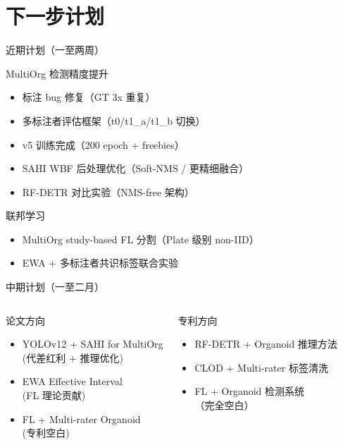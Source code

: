 \documentclass[aspectratio=169, 11pt]{beamer}
\begin{document}
\section{下一步计划}

\begin{frame}{近期计划（一至两周）}
  \begin{block}{MultiOrg 检测精度提升}
    \begin{itemize}
      \item[\checkmark] 标注 bug 修复（GT 3x 重复）
      \item[\checkmark] 多标注者评估框架（t0/t1\_a/t1\_b 切换）
      \item[$\circ$] v5 训练完成（200 epoch + freebies）
      \item[$\circ$] SAHI WBF 后处理优化（Soft-NMS / 更精细融合）
      \item[$\circ$] RF-DETR 对比实验（NMS-free 架构）
    \end{itemize}
  \end{block}
  \begin{block}{联邦学习}
    \begin{itemize}
      \item[$\circ$] MultiOrg study-based FL 分割（Plate 级别 non-IID）
      \item[$\circ$] EWA + 多标注者共识标签联合实验
    \end{itemize}
  \end{block}
\end{frame}

\begin{frame}{中期计划（一至二月）}
  \begin{columns}[T]
    \begin{block}{论文方向}
      \begin{itemize}
        \item YOLOv12 + SAHI for MultiOrg\\
              (代差红利 + 推理优化)
        \item EWA Effective Interval\\
              (FL 理论贡献)
        \item FL + Multi-rater Organoid\\
              (专利空白)
      \end{itemize}
    \end{block}
    \begin{block}{专利方向}
      \begin{itemize}
        \item RF-DETR + Organoid 推理方法
        \item CLOD + Multi-rater 标签清洗
        \item FL + Organoid 检测系统\\
              （完全空白）
      \end{itemize}
    \end{block}
  \end{columns}
\end{frame}
\end{document}
